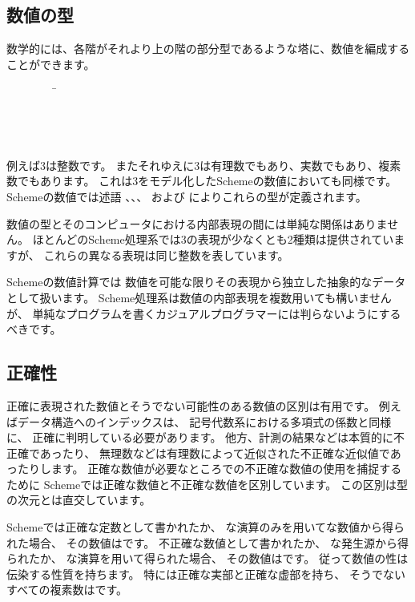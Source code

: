 \subsection{数値の型}
\label{numericaltypes}

\vest 数学的には、各階がそれより上の階の部分型であるような塔に、数値を編成することができます。
\begin{tabbing}
\ \ \ \ \ \ \ \ \ \= \\
\>  \\
\>  \\
\>  \\
\>  
\end{tabbing}

例えば3は整数です。
またそれゆえに3は有理数でもあり、実数でもあり、複素数でもあります。
これは3をモデル化したSchemeの数値においても同様です。
Schemeの数値では述語
、、、 および 
によりこれらの型が定義されます。

数値の型とそのコンピュータにおける内部表現の間には単純な関係はありません。
ほとんどのScheme処理系では3の表現が少なくとも2種類は提供されていますが、
これらの異なる表現は同じ整数を表しています。

Schemeの数値計算では
数値を可能な限りその表現から独立した抽象的なデータとして扱います。
Scheme処理系は数値の内部表現を複数用いても構いませんが、
単純なプログラムを書くカジュアルプログラマーには判らないようにするべきです。

\subsection{正確性}

 \label{exactly}

正確に表現された数値とそうでない可能性のある数値の区別は有用です。
例えばデータ構造へのインデックスは、
記号代数系における多項式の係数と同様に、
正確に判明している必要があります。
他方、計測の結果などは本質的に不正確であったり、
無理数などは有理数によって近似された不正確な近似値であったりします。
正確な数値が必要なところでの不正確な数値の使用を捕捉するために
Schemeでは正確な数値と不正確な数値を区別しています。
この区別は型の次元とは直交しています。

Schemeでは正確な定数として書かれたか、
な演算のみを用いてな数値から得られた場合、
その数値はです。
不正確な数値として書かれたか、
な発生源から得られたか、
な演算を用いて得られた場合、
その数値はです。
従って数値の性は伝染する性質を持ちます。
特には正確な実部と正確な虚部を持ち、
そうでないすべての複素数はです。

